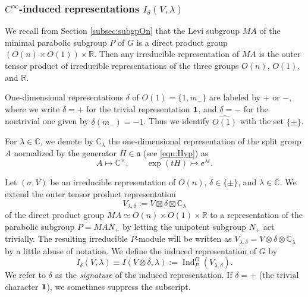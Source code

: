 \subsubsection{$C^{\infty}$-induced representations $I_\delta(V,\lambda)$}  
\label{subsec:smoothI}

We recall from Section \ref{subsec:subgpOn}
 that the Levi subgroup $M A$ of the minimal parabolic subgroup $P$
 of $G$ is a direct product group 
 $(O(n) \times O(1)) \times {\mathbb{R}}$.  
Then any irreducible representation
 of $M A$
 is the outer tensor product
 of irreducible representations
 of the three groups $O(n)$, $O(1)$, and ${\mathbb{R}}$.  



One-dimensional representations $\delta$
 of
 $O(1)=\{1,m_-\}$
 are labeled by $+$ or $-$, 
 where we write $\delta=+$ for the trivial representation ${\bf{1}}$,
 and $\delta=-$ for the nontrivial one
 given by $\delta(m_-)=-1$.  
Thus we identify $\widehat{O(1)}$ with the set $\{\pm\}$.  



For $\lambda \in {\mathbb{C}}$, 
 we denote by 
${\mathbb{C}}_{\lambda}$
 the one-dimensional representation
 of the split group $A$
 normalized 
 by the generator $H \in {\mathfrak{a}}$
 (see \eqref{eqn:Hyp}) as 
\[
   A \mapsto {\mathbb{C}}^{\times}, 
  \qquad
  \exp(t H) \mapsto e^{\lambda t}.  
\]



Let $(\sigma, V)$ be an irreducible representation of $O(n)$, 
 $\delta \in \{\pm\}$, 
 and $\lambda \in{\mathbb{C}}$.  
We extend the outer tensor product representation
\begin{equation}
\label{eqn:Vlmddelta}
 V_{\lambda,\delta}
:=V \boxtimes \delta \boxtimes{\mathbb{C}}_{\lambda}
\end{equation}
of the direct product group $MA \simeq O(n) \times O(1) \times {\mathbb{R}}
$
 to a representation
 of the parabolic subgroup $P=MAN_+$
 by letting the unipotent subgroup $N_+$ act trivially.  
The resulting irreducible $P$-module will be written 
as 
$
   V_{\lambda,\delta}
   =V \otimes \delta \otimes{\mathbb{C}}_{\lambda}
$
 by a little abuse of notation.  
We define  the induced representation of $G$ by 
\[
   I_\delta({V},\lambda)
  \equiv I({V}\otimes \delta, \lambda)
  := {\operatorname{Ind}}_P^G(V_{\lambda,\delta}).
\]
We refer to $\delta$ as the 
{\it{signature}} of the induced representation. 
If $\delta=+$ (the trivial character ${\bf{1}}$),
 we sometimes suppress the subscript.  




